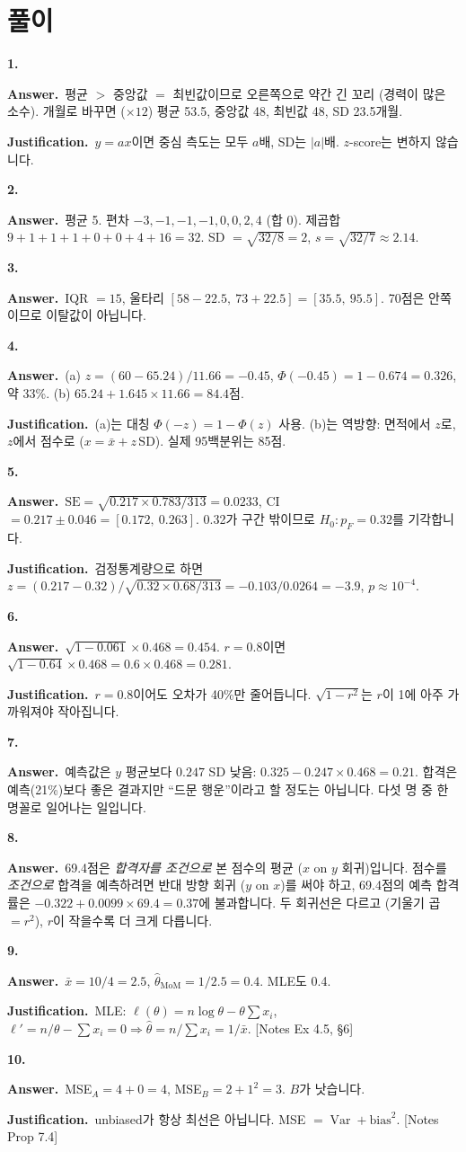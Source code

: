 \documentclass[11pt,a4paper]{article}
\newcommand{\Var}{\operatorname{Var}}
\newcommand{\SD}{\mathrm{SD}}
\newcommand{\SE}{\mathrm{SE}}
\newcommand{\nref}[1]{{\footnotesize\textsf{\color{blue!55!black}[Notes #1]}}}
\newcommand{\Ans}{\par\textbf{Answer.}\ }
\newcommand{\Just}{\par\textbf{Justification.}\ }
\begin{document}
\section{풀이}
\textbf{1.}
\Ans 평균 $>$ 중앙값 $=$ 최빈값이므로 오른쪽으로 약간 긴 꼬리 (경력이 많은 소수). 개월로 바꾸면 ($\times12$) 평균 53.5, 중앙값 48, 최빈값 48, SD 23.5개월.
\Just $y=ax$이면 중심 측도는 모두 $a$배, SD는 $|a|$배. $z$-score는 변하지 않습니다.

\textbf{2.}
\Ans 평균 5. 편차 $-3,-1,-1,-1,0,0,2,4$ (합 0). 제곱합 $9+1+1+1+0+0+4+16=32$. SD $=\sqrt{32/8}=2$, $s=\sqrt{32/7}\approx2.14$.

\textbf{3.}
\Ans IQR $=15$, 울타리 $[58-22.5,\ 73+22.5]=[35.5,\ 95.5]$. 70점은 안쪽이므로 이탈값이 아닙니다.

\textbf{4.}
\Ans (a) $z=(60-65.24)/11.66=-0.45$, $\Phi(-0.45)=1-0.674=0.326$, 약 33\%. (b) $65.24+1.645\times11.66=84.4$점.
\Just (a)는 대칭 $\Phi(-z)=1-\Phi(z)$ 사용. (b)는 역방향: 면적에서 $z$로, $z$에서 점수로 ($x=\bar x+z\,\SD$). 실제 95백분위는 85점.

\textbf{5.}
\Ans $\SE=\sqrt{0.217\times0.783/313}=0.0233$, CI $=0.217\pm0.046=[0.172,\ 0.263]$. 0.32가 구간 밖이므로 $H_0:p_F=0.32$를 기각합니다.
\Just 검정통계량으로 하면 $z=(0.217-0.32)/\sqrt{0.32\times0.68/313}=-0.103/0.0264=-3.9$, $p\approx10^{-4}$.

\textbf{6.}
\Ans $\sqrt{1-0.061}\times0.468=0.454$. $r=0.8$이면 $\sqrt{1-0.64}\times0.468=0.6\times0.468=0.281$.
\Just $r=0.8$이어도 오차가 40\%만 줄어듭니다. $\sqrt{1-r^2}$는 $r$이 1에 아주 가까워져야 작아집니다.

\textbf{7.}
\Ans 예측값은 $y$ 평균보다 $0.247$ SD 낮음: $0.325-0.247\times0.468=0.21$. 합격은 예측(21\%)보다 좋은 결과지만 ``드문 행운''이라고 할 정도는 아닙니다. 다섯 명 중 한 명꼴로 일어나는 일입니다.

\textbf{8.}
\Ans 69.4점은 \emph{합격자를 조건으로} 본 점수의 평균 ($x$ on $y$ 회귀)입니다. 점수를 \emph{조건으로} 합격을 예측하려면 반대 방향 회귀 ($y$ on $x$)를 써야 하고, 69.4점의 예측 합격률은 $-0.322+0.0099\times69.4=0.37$에 불과합니다. 두 회귀선은 다르고 (기울기 곱 $=r^2$), $r$이 작을수록 더 크게 다릅니다.

\textbf{9.}
\Ans $\bar x=10/4=2.5$, $\hat\theta_{\text{MoM}}=1/2.5=0.4$. MLE도 0.4.
\Just MLE: $\ell(\theta)=n\log\theta-\theta\sum x_i$, $\ell'=n/\theta-\sum x_i=0\Rightarrow\hat\theta=n/\sum x_i=1/\bar x$. \nref{Ex 4.5, §6}

\textbf{10.}
\Ans MSE$_A=4+0=4$, MSE$_B=2+1^2=3$. $B$가 낫습니다.
\Just unbiased가 항상 최선은 아닙니다. MSE $=\Var+\text{bias}^2$. \nref{Prop 7.4}
\end{document}
